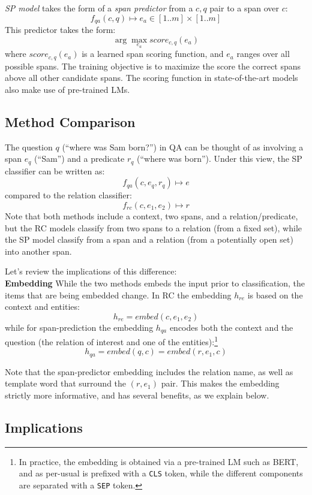 \documentclass[11pt]{article}
\begin{document}
\noindent\emph{SP model} takes the form of a \emph{span predictor} from a $c,q$ pair to a span over $c$:
\[f_{qa}(c, q) \mapsto e_a \in [1 .. m] \times [1 .. m] \]
\noindent This predictor takes the form: \[\arg\max_{e_a}score_{c,q}(e_a)\] 
\noindent where $score_{c,q}(e_a)$ is a learned span scoring function, and $e_a$ ranges over all possible spans. The training objective is to maximize the score the correct spans above all other candidate spans. The scoring function in state-of-the-art models \cite{McCann2018,He2015,Wu2019} also make use of pre-trained LMs. 



\subsection{Method Comparison} \label{ssec:compare}
The question $q$ (``where was Sam born?'') in QA can be thought of as involving a span $e_q$ (``Sam'') and a predicate $r_q$ (``where was born''). Under this view, the SP classifier can be written as:
\[f_{qa}(c,e_q,r_q)\mapsto e\] 
compared to the relation classifier: 
\[f_{rc}(c,e_1,e_2) \mapsto r\] Note that both methods include a context, two spans, and a relation/predicate, but the RC models classify from two spans to a relation (from a fixed set), while the SP model classify from a span and a relation (from a potentially open set) into another span.

Let's review the implications of this difference:\\

\noindent\textbf{Embedding} 
While the two methods embeds the input prior to classification, the items that are being embedded change. In RC the embedding $h_{re}$ is based on the context and entities:
\[ h_{re} = embed(c, e_1, e_2) \]
while for span-prediction the embedding $h_{qa}$
 encodes both the context and the question (the relation of interest and one of the entities):\footnote{In practice, the embedding is obtained via a pre-trained LM such as BERT, and as per-usual is prefixed with a \texttt{CLS} token, while the different components are separated with a \texttt{SEP} token.}
\[ h_{qa} = embed(q, c) = embed(r, e_1, c) \]

Note that the span-predictor embedding includes the relation name, as well as template word that surround the $(r, e_1)$ pair. This makes the embedding strictly more informative, and has several benefits, as we explain below.


\subsection{Implications}
\end{document}
